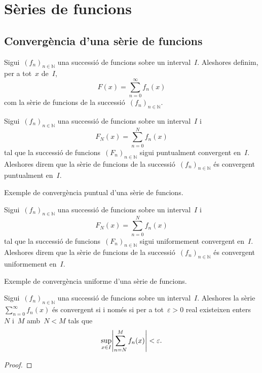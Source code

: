 \documentclass[../../Main.tex]{subfiles}
\begin{document}
\section{Sèries de funcions}
	\subsection{Convergència d'una sèrie de funcions}
	\begin{definition}
		Sigui~\((f_{n})_{n\in\mathbb{N}}\) una successió de funcions sobre un interval~\(I\).
		Aleshores definim, per a tot~\(x\) de~\(I\),
		\[
		    F(x)=\sum_{n=0}^{\infty}f_{n}(x)
		\]
		com la sèrie de funcions de la successió~\((f_{n})_{n\in\mathbb{N}}\).
	\end{definition}
	\begin{definition}
		\label{def:convergència puntual d'una sèrie de funcions}
		Sigui~\((f_{n})_{n\in\mathbb{N}}\) una successió de funcions sobre un interval~\(I\) i
		\[
		    F_{N}(x)=\sum_{n=0}^{N}f_{n}(x)
		\]
		tal que la successió de funcions~\((F_{n})_{n\in\mathbb{N}}\) sigui puntualment convergent en~\(I\).
		Aleshores direm que la sèrie de funcions de la successió~\((f_{n})_{n\in\mathbb{N}}\) és convergent puntualment en~\(I\).
	\end{definition}
	\begin{example}
		Exemple de convergència puntual d'una sèrie de funcions.
		\begin{solution}
		\end{solution}
	\end{example}
	\begin{definition}
		\label{def:convergència uniforme d'una sèrie de funcions}
		Sigui~\((f_{n})_{n\in\mathbb{N}}\) una successió de funcions sobre un interval~\(I\) i
		\[
		    F_{N}(x)=\sum_{n=0}^{N}f_{n}(x)
		\]
		tal que la successió de funcions~\((F_{n})_{n\in\mathbb{N}}\) sigui uniformement convergent en~\(I\).
		Aleshores direm que la sèrie de funcions de la successió~\((f_{n})_{n\in\mathbb{N}}\) és convergent uniformement en~\(I\).
	\end{definition}
	\begin{example}
		Exemple de convergència uniforme d'una sèrie de funcions.
		\begin{solution}
		\end{solution}
	\end{example}
	\begin{theorem}
		\label{def:condició de Cauchy per sèries de funcions}
		Sigui~\((f_{n})_{n\in\mathbb{N}}\) una successió de funcions sobre un interval~\(I\).
		Aleshores la sèrie~\(\sum_{n=0}^{\infty}f_{n}(x)\) és convergent si i només si per a tot~\(\varepsilon>0\) real existeixen enters~\(N\) i~\(M\) amb~\(N<M\) tals que
		\[
		    \sup_{x\in I}\abs{\sum_{n=N}^{M}f_{n}(x)}<\varepsilon.
		\]
		\begin{proof}
		\end{proof}
	\end{theorem}
\end{document}
